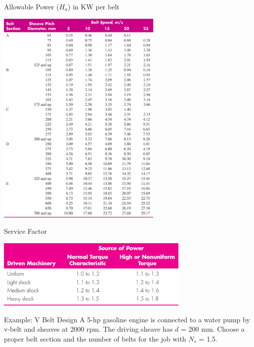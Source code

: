 \documentclass[10pt, svgnames]{beamer}
\begin{document}
\begin{frame}[label={sec:org87f8442}]{Allowable Power (\(H_a\)) in KW per belt}
\vspace{-2mm}
\begin{center}
\includegraphics[width=0.6\textwidth]{./pictures/belt-power-rating.png}
\end{center}
\end{frame}

\begin{frame}[label={sec:org40db861}]{Service Factor}
\begin{center}
\includegraphics[width=0.7\textwidth]{./pictures/belt-service-factor.png}
\end{center}
\end{frame}

\begin{frame}[label={sec:orgfb20dec}]{Example: V Belt Design}
A 5-hp gasoline engine is connected to a water pump by v-belt and sheaves at 2000 rpm. The driving sheave has \(d\) = 200 mm. Choose a proper belt section and the number of belts for the job with \(N_s\) = 1.5.
\end{frame}
\end{document}
